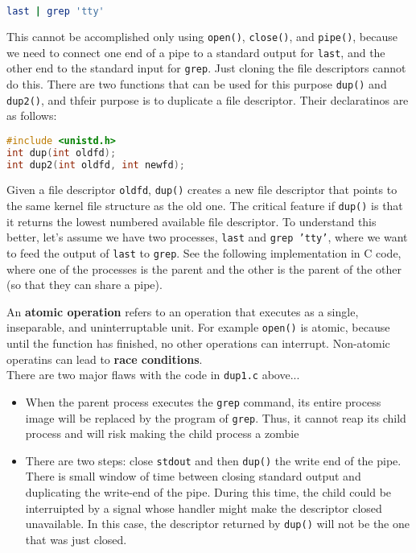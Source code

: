 \documentclass{article}
\newcommand{\bold}[1]{\textbf{#1}}
\renewcommand{\b}{\item[$\circ$]}
\newcommand{\newlist}{\begin{itemize}}
\renewcommand{\endlist}{\end{itemize}}
\newcommand{\code}[1]{\texttt{#1}}
\begin{document}
\begin{lstlisting}[language=bash]
last | grep 'tty'
\end{lstlisting}

This cannot be accomplished only using \code{open()}, \code{close()}, and \code{pipe()}, because we need to connect one end of a pipe to a standard output for \code{last}, and the other end to the standard input for \code{grep}. Just cloning the file descriptors cannot do this. There are two functions that can be used for this purpose \code{dup()} and \code{dup2()}, and thfeir purpose is to duplicate a file descriptor. Their declaratinos are as follows: 

\begin{lstlisting}[language=C]
#include <unistd.h>
int dup(int oldfd);
int dup2(int oldfd, int newfd);
\end{lstlisting}

\noindent Given a file descriptor \code{oldfd}, \code{dup()} creates a new file descriptor that points to the same kernel file structure as the old one. The critical feature if \code{dup()} is that it returns the lowest numbered available file descriptor. To understand this better, let's assume we have two processes, \code{last} and \code{grep 'tty'}, where we want to feed the output of \code{last} to \code{grep}. See the following implementation in C code, where one of the processes is the parent and the other is the parent of the other (so that they can share a pipe). 



\noindent An \bold{atomic operation} refers to an operation that executes as a single, inseparable, and uninterruptable unit. For example \code{open()} is atomic, because until the function has finished, no other operations can interrupt. Non-atomic operatins can lead to \bold{race conditions}. \\ 

There are two major flaws with the code in \code{dup1.c} above...

\newlist 
\b When the parent process executes the \code{grep} command, its entire process image will be replaced by the program of \code{grep}. Thus, it cannot reap its child process and will risk making the child process a zombie
\b There are two steps: close \code{stdout} and then \code{dup()} the write end of the pipe. There is small window of time between closing standard output and duplicating the write-end of the pipe. During this time, the child could be interruipted by a signal whose handler might make the descriptor closed unavailable. In this case, the descriptor returned by \code{dup()} will not be the one that was just closed. 
\endlist 
\end{document}
